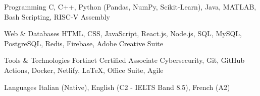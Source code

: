 

\begin{cvskills}

  \cvskill
    {Programming} %
    {C, C++, Python (Pandas, NumPy, Scikit-Learn), Java, MATLAB, Bash Scripting, RISC-V Assembly}

  \cvskill
    {Web \& Databases} %
    {HTML, CSS, JavaScript, React.js, Node.js, SQL, MySQL, PostgreSQL, Redis, Firebase, Adobe Creative Suite}

  \cvskill
    {Tools \& Technologies} %
    {Fortinet Certified Associate Cybersecurity, Git, GitHub Actions, Docker, Netlify, LaTeX, Office Suite, Agile}

  \cvskill
    {Languages} %
    {Italian (Native), English (C2 - IELTS Band 8.5), French (A2)} %
\end{cvskills}
